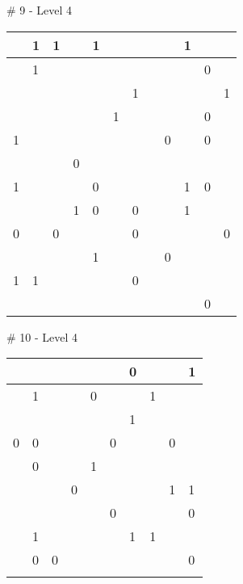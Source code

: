 \medskip

\# 9 - Level 4 \newline
\begin{tabular}{|m{\collen}|m{\collen}|m{\collen}|m{\collen}|m{\collen}|m{\collen}|m{\collen}|m{\collen}|m{\collen}|m{\collen}|m{\collen}|m{\collen}|}
\hline
    & 1 & 1 &   & 1 &   &   &   &   & 1 &   &   \\
\hline
    & 1 &   &   &   &   &   &   &   &   & 0 &   \\
\hline
    &   &   &   &   &   & 1 &   &   &   &   & 1 \\
\hline
    &   &   &   &   & 1 &   &   &   &   & 0 &   \\
\hline
  1 &   &   &   &   &   &   &   & 0 &   & 0 &   \\
\hline
    &   &   & 0 &   &   &   &   &   &   &   &   \\
\hline
  1 &   &   &   & 0 &   &   &   &   & 1 & 0 &   \\
\hline
    &   &   & 1 & 0 &   & 0 &   &   & 1 &   &   \\
\hline
  0 &   & 0 &   &   &   & 0 &   &   &   &   & 0 \\
\hline
    &   &   &   & 1 &   &   &   & 0 &   &   &   \\
\hline
  1 & 1 &   &   &   &   & 0 &   &   &   &   &   \\
\hline
    &   &   &   &   &   &   &   &   &   & 0 &   \\
\hline
\end{tabular}


\medskip

\# 10 - Level 4 \newline
\begin{tabular}{|m{\collen}|m{\collen}|m{\collen}|m{\collen}|m{\collen}|m{\collen}|m{\collen}|m{\collen}|m{\collen}|m{\collen}|}
\hline
    &   &   &   &   &   & 0 &   &   & 1 \\
\hline
    & 1 &   &   & 0 &   &   & 1 &   &   \\
\hline
    &   &   &   &   &   & 1 &   &   &   \\
\hline
  0 & 0 &   &   &   & 0 &   &   & 0 &   \\
\hline
    & 0 &   &   & 1 &   &   &   &   &   \\
\hline
    &   &   & 0 &   &   &   &   & 1 & 1 \\
\hline
    &   &   &   &   & 0 &   &   &   & 0 \\
\hline
    & 1 &   &   &   &   & 1 & 1 &   &   \\
\hline
    & 0 & 0 &   &   &   &   &   &   & 0 \\
\hline
    &   &   &   &   &   &   &   &   &   \\
\hline
\end{tabular}


